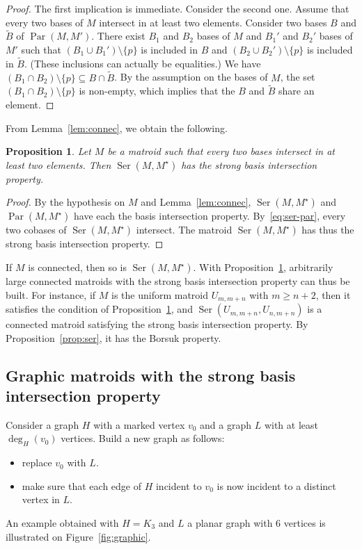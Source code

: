 \documentclass[12pt]{amsart}
\theoremstyle{plain}
\newtheorem{proposition}[theorem]{Proposition}
\theoremstyle{definition}
\theoremstyle{remark}
\renewcommand{\geq}{\geqslant}
\newcommand{\Ser}{\operatorname{Ser}}
\newcommand{\Par}{\operatorname{Par}}
\begin{document}
\begin{proof}
The first implication is immediate. Consider the second one. Assume that every two bases of $M$ intersect in at least two elements. Consider two bases $B$ and $\tilde B$ of $\Par(M,M')$. There exist $B_1$ and $B_2$  bases of $M$ and $B_1'$ and $B_2'$ bases of $M'$ such that $(B_1 \cup B_1')\setminus \{p\}$ is included in $B$ and $(B_2 \cup B_2')\setminus \{p\}$ is included in $\tilde B$. (These inclusions can actually be equalities.) We have $(B_1 \cap B_2) \setminus\{p\} \subseteq B \cap \tilde B$. By the assumption on the bases of $M$, the set $(B_1 \cap B_2) \setminus\{p\}$ is non-empty, which implies that the $B$ and $\tilde B$ share an element.
\end{proof}

From Lemma~\ref{lem:connec}, we obtain the following.

\begin{proposition}\label{prop:sbip-ser}
Let $M$ be a matroid such that every two bases intersect in at least two elements. Then $\Ser(M,M^\star)$ has the strong basis intersection property.
\end{proposition}

\begin{proof}
By the hypothesis on $M$ and Lemma~\ref{lem:connec}, $\Ser(M,M^\star)$ and $\Par(M,M^\star)$ have each the basis intersection property. By~\eqref{eq:ser-par}, every two cobases of $\Ser(M,M^\star)$ intersect. The matroid $\Ser(M,M^\star)$ has thus the strong basis intersection property.
\end{proof}

If $M$ is connected, then so is $\Ser(M,M^\star)$. With Proposition~\ref{prop:sbip-ser}, arbitrarily large connected matroids with the strong basis intersection property can thus be built. For instance, if $M$ is the uniform matroid $U_{m,m+n}$ with $m \geq n+2$, then it satisfies the condition of Proposition~\ref{prop:sbip-ser}, and $\Ser(U_{m,m+n},U_{n,m+n})$ is a connected matroid satisfying the strong basis intersection property. By Proposition~\ref{prop:ser}, it has the Borsuk property.


\subsection{Graphic matroids with the strong basis intersection property}\label{subsec:graphic}

Consider a graph $H$ with a marked vertex $v_0$ and a graph $L$ with at least $\deg_H(v_0)$ vertices. Build a new graph as follows: 
\begin{itemize}
\item replace $v_0$ with $L$.
\item make sure that each edge of $H$ incident to $v_0$ is now incident to a distinct vertex in $L$.
\end{itemize}
An example obtained with $H=K_3$ and $L$ a planar graph with $6$ vertices is illustrated on Figure~\ref{fig:graphic}.
\end{document}
